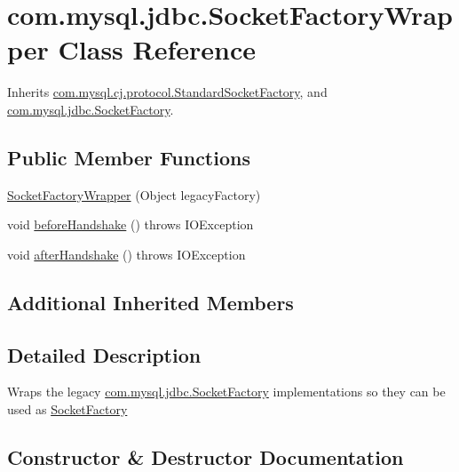 \hypertarget{classcom_1_1mysql_1_1jdbc_1_1_socket_factory_wrapper}{}\section{com.\+mysql.\+jdbc.\+Socket\+Factory\+Wrapper Class Reference}
\label{classcom_1_1mysql_1_1jdbc_1_1_socket_factory_wrapper}


Inherits \mbox{\hyperlink{classcom_1_1mysql_1_1cj_1_1protocol_1_1_standard_socket_factory}{com.\+mysql.\+cj.\+protocol.\+Standard\+Socket\+Factory}}, and \mbox{\hyperlink{interfacecom_1_1mysql_1_1jdbc_1_1_socket_factory}{com.\+mysql.\+jdbc.\+Socket\+Factory}}.

\subsection*{Public Member Functions}
\begin{DoxyCompactItemize}
\item 
\mbox{\hyperlink{classcom_1_1mysql_1_1jdbc_1_1_socket_factory_wrapper_ae99060438754f84f9f177f772fc32feb}{Socket\+Factory\+Wrapper}} (Object legacy\+Factory)
\item 
void \mbox{\hyperlink{classcom_1_1mysql_1_1jdbc_1_1_socket_factory_wrapper_a6c39038cbdf685cde6e0ce84cecde918}{before\+Handshake}} ()  throws I\+O\+Exception 
\item 
void \mbox{\hyperlink{classcom_1_1mysql_1_1jdbc_1_1_socket_factory_wrapper_ab7dde0fd740255950d83759b418fd2ff}{after\+Handshake}} ()  throws I\+O\+Exception 
\end{DoxyCompactItemize}
\subsection*{Additional Inherited Members}


\subsection{Detailed Description}
Wraps the legacy \mbox{\hyperlink{interfacecom_1_1mysql_1_1jdbc_1_1_socket_factory}{com.\+mysql.\+jdbc.\+Socket\+Factory}} implementations so they can be used as \mbox{\hyperlink{interfacecom_1_1mysql_1_1jdbc_1_1_socket_factory}{Socket\+Factory}} 

\subsection{Constructor \& Destructor Documentation}
\mbox{\label{classcom_1_1mysql_1_1jdbc_1_1_socket_factory_wrapper_ae99060438754f84f9f177f772fc32feb}} 
